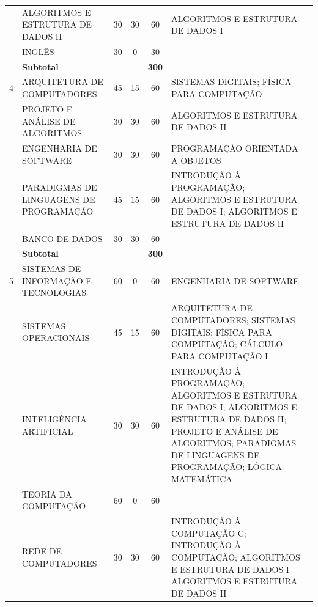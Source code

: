 \documentclass[
	12pt,				%
	openright,			%
  oneside,     %
	a4paper,			%
 hyphens,
	chapter=TITLE,		%
	english,			%
	french,				%
	spanish,			%
	brazil				%
	]{abntex2}
\begin{document}
\begin{center}
\begin{tiny}
\begin{longtable}{cp{4.5cm}cccp{2.8cm}p{2.8cm}}
        & ALGORITMOS E ESTRUTURA DE DADOS II & 30 & 30 & 60 & ALGORITMOS E ESTRUTURA DE DADOS I & \\ \cline{2-7}
        & INGLÊS & 30 & 0 & 30  & &\\ \midrule
        & \multicolumn{3}{l}{\textbf{Subtotal}} & \textbf{300} & & \\ \midrule
    4 
        & ARQUITETURA DE COMPUTADORES & 45 & 15 & 60 & SISTEMAS DIGITAIS; \newline FÍSICA PARA COMPUTAÇÃO & \\ \cline{2-7}
        & PROJETO E ANÁLISE DE ALGORITMOS & 30 & 30 & 60 & ALGORITMOS E ESTRUTURA DE DADOS II & \\ \cline{2-7}
        & ENGENHARIA DE SOFTWARE & 30 & 30 & 60 & PROGRAMAÇÃO ORIENTADA A OBJETOS & \\ \cline{2-7}
        & PARADIGMAS DE LINGUAGENS DE PROGRAMAÇÃO & 45 & 15 & 60 & INTRODUÇÃO À PROGRAMAÇÃO; \newline ALGORITMOS E ESTRUTURA DE DADOS I; \newline ALGORITMOS E ESTRUTURA DE DADOS II & \\ \cline{2-7}
        & BANCO DE DADOS & 30 & 30 & 60 & & \\ \cline{2-7}
        & \multicolumn{3}{l}{\textbf{Subtotal}} & \textbf{300} & & \\ \midrule
    5 
        & SISTEMAS DE INFORMAÇÃO E TECNOLOGIAS & 60 & 0 & 60 & ENGENHARIA DE SOFTWARE & \\ \cline{2-7}
        & SISTEMAS OPERACIONAIS & 45 & 15 & 60 & ARQUITETURA DE COMPUTADORES; \newline SISTEMAS DIGITAIS; \newline FÍSICA PARA COMPUTAÇÃO; \newline CÁLCULO PARA COMPUTAÇÃO I & \\ \cline{2-7}
        & INTELIGÊNCIA ARTIFICIAL & 30 & 30 & 60 & INTRODUÇÃO À PROGRAMAÇÃO; \newline ALGORITMOS E ESTRUTURA DE DADOS I; \newline ALGORITMOS E ESTRUTURA DE DADOS II; \newline PROJETO E ANÁLISE DE ALGORITMOS; \newline PARADIGMAS DE LINGUAGENS DE PROGRAMAÇÃO; \newline LÓGICA MATEMÁTICA & \\ \cline{2-7}
        & TEORIA DA COMPUTAÇÃO & 60 & 0 & 60 & & \\ \cline{2-7}
        & REDE DE COMPUTADORES & 30 & 30 & 60 & INTRODUÇÃO À COMPUTAÇÃO C; \newline INTRODUÇÃO À COMPUTAÇÃO; \newline ALGORITMOS E ESTRUTURA DE DADOS I \newline ALGORITMOS E ESTRUTURA DE DADOS II & \\ \midrule

\end{longtable}
\end{tiny}
\end{center}
\end{document}
